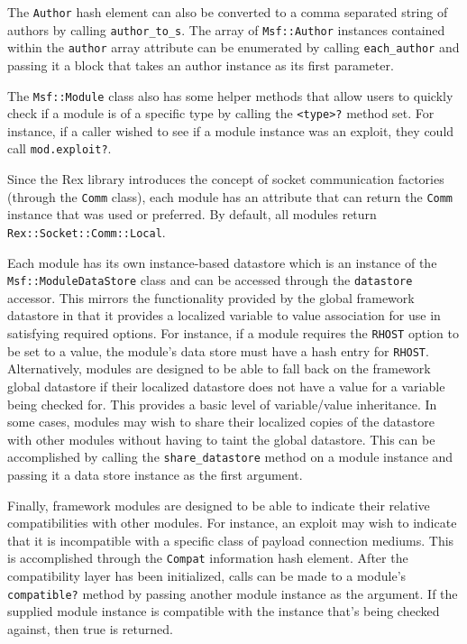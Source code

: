 \documentclass{report}
\begin{document}
\par
The \texttt{Author} hash element can also be converted to a comma
separated string of authors by calling \texttt{author\_to\_s}.  The
array of \texttt{Msf::Author} instances contained within the
\texttt{author} array attribute can be enumerated by calling
\texttt{each\_author} and passing it a block that takes an author
instance as its first parameter.

\par
The \texttt{Msf::Module} class also has some helper methods that
allow users to quickly check if a module is of a specific type by
calling the \texttt{<type>?} method set.  For instance, if a caller
wished to see if a module instance was an exploit, they could call
\texttt{mod.exploit?}.

\par
Since the Rex library introduces the concept of socket communication
factories (through the \texttt{Comm} class), each module has an
attribute that can return the \texttt{Comm} instance that was used
or preferred.  By default, all modules return
\texttt{Rex::Socket::Comm::Local}.

\par
Each module has its own instance-based datastore which is an
instance of the \texttt{Msf::ModuleDataStore} class and can be
accessed through the \texttt{datastore} accessor. This mirrors the
functionality provided by the global framework datastore in that it
provides a localized variable to value association for use in
satisfying required options.  For instance, if a module requires the
\texttt{RHOST} option to be set to a value, the module's data store
must have a hash entry for \texttt{RHOST}. Alternatively, modules
are designed to be able to fall back on the framework global
datastore if their localized datastore does not have a value for a
variable being checked for. This provides a basic level of
variable/value inheritance.  In some cases, modules may wish to
share their localized copies of the datastore with other modules
without having to taint the global datastore.  This can be
accomplished by calling the \texttt{share\_datastore} method on a
module instance and passing it a data store instance as the first
argument.

\par
Finally, framework modules are designed to be able to indicate their
relative compatibilities with other modules.  For instance, an
exploit may wish to indicate that it is incompatible with a specific
class of payload connection mediums.  This is accomplished through
the \texttt{Compat} information hash element.  After the
compatibility layer has been initialized, calls can be made to a
module's \texttt{compatible?} method by passing another module
instance as the argument.  If the supplied module instance is
compatible with the instance that's being checked against, then true
is returned.
\end{document}
